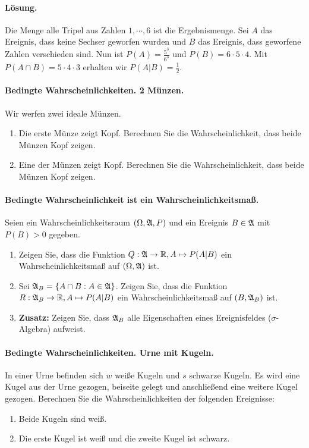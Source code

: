 \paragraph*{Lösung.} Die Menge alle Tripel aus Zahlen $1,\cdots,6$ ist die
Ergebnismenge.  Sei $A$ das Ereignis, dass keine Sechser geworfen wurden und
$B$ das Ereignis, dass geworfene Zahlen verschieden sind. Nun ist $P(A) =
\frac{5^3}{6^3}$ und $P(B)= 6\cdot 5\cdot 4$. Mit $P(A \cap B) = 5\cdot 4\cdot
3$ erhalten wir $P(A|B)=\frac{1}{2}$.


\paragraph{Bedingte Wahrscheinlichkeiten. 2 Münzen.} Wir werfen zwei ideale Münzen.
\begin{enumerate}
    \item Die erste Münze zeigt Kopf. Berechnen Sie die Wahrscheinlichkeit,
        dass beide Münzen Kopf zeigen.

    \item Eine der Münzen zeigt Kopf. Berechnen Sie die Wahrscheinlichkeit,
        dass beide Münzen Kopf zeigen.
\end{enumerate}


\paragraph{Bedingte Wahrscheinlichkeit ist ein Wahrscheinlichkeitsmaß.}
Seien ein Wahrscheinlichkeitsraum $(\Omega, \mathfrak A, P)$ und ein Ereignis $B\in\mathfrak A$
mit $P(B)>0$ gegeben. 
\begin{enumerate}
    \item Zeigen Sie, dass die Funktion $Q: \mathfrak A \to \mathbb R, A \mapsto P(A|B)$ ein
        Wahrscheinlichkeitsmaß auf $(\Omega, \mathfrak A)$ ist.
    \item Sei $\mathfrak A_B = \left\{ A \cap B : A\in \mathfrak A \right\}$. Zeigen Sie, dass
        die Funktion $R: \mathfrak A_B \to \mathbb R, A \mapsto P(A|B)$ ein Wahrscheinlichkeitsmaß
        auf $\left( B, \mathfrak A_B \right)$ ist. 
    \item \textbf{Zusatz:} Zeigen Sie, dass $\mathfrak A_B$ alle Eigenschaften eines Ereignisfeldes ($\sigma$-Algebra) aufweist.
\end{enumerate}


\paragraph{Bedingte Wahrscheinlichkeiten. Urne mit Kugeln.} In einer Urne
befinden sich $w$ weiße Kugeln und $s$ schwarze Kugeln. Es wird eine Kugel aus
der Urne gezogen, beiseite gelegt und anschließend eine weitere Kugel gezogen.
Berechnen Sie die Wahrscheinlichkeiten der folgenden Ereignisse:
\begin{enumerate}
    \item Beide Kugeln sind weiß.
    \item Die erste Kugel ist weiß und die zweite Kugel ist schwarz.
\end{enumerate}

